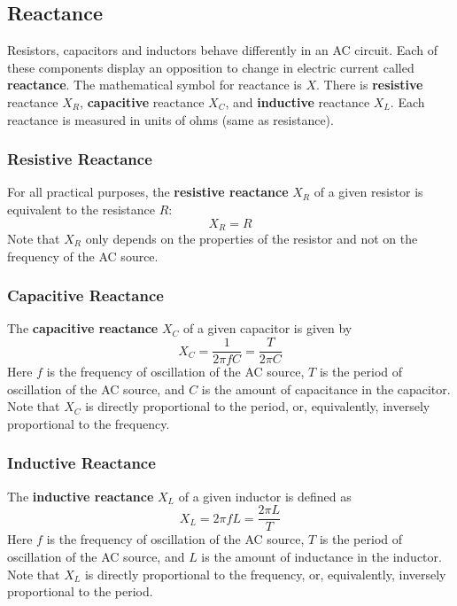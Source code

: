 \subsection{Reactance}
Resistors, capacitors and inductors behave differently in an AC circuit. Each of these components display an opposition to change in electric current called \textbf{reactance}. The mathematical symbol for reactance is $X$. There is \textbf{resistive} reactance $X_{R}$, \textbf{capacitive} reactance $X_{C}$, and \textbf{inductive} reactance $X_{L}$. Each reactance is measured in units of ohms (same as resistance).
\subsubsection{Resistive Reactance}
For all practical purposes, the \textbf{resistive reactance} $X_{R}$ of a given resistor is equivalent to the resistance $R$:
\begin{equation} \label{eq.06.reactance.R}
	X_{R} = R
\end{equation}
Note that $X_{R}$ only depends on the properties of the resistor and not on the frequency of the AC source.
\subsubsection{Capacitive Reactance}
The \textbf{capacitive reactance} $X_{C}$ of a given capacitor is given by
\begin{equation} \label{eq.06.reactance.C}
	X_{C} = \frac{1}{2 \pi f C} = \frac{T}{2 \pi C}
\end{equation}
Here $f$ is the frequency of oscillation of the AC source, $T$ is the period of oscillation of the AC source, and $C$ is the amount of capacitance in the capacitor. Note that $X_{C}$ is directly proportional to the period, or, equivalently, inversely proportional to the frequency.
\subsubsection{Inductive Reactance}
The \textbf{inductive reactance} $X_{L}$ of a given inductor is defined as
\begin{equation} \label{eq.06.reactance.L}
	X_{L} = 2 \pi f L = \frac{2 \pi L}{T}
\end{equation}
Here $f$ is the frequency of oscillation of the AC source, $T$ is the period of oscillation of the AC source, and $L$ is the amount of inductance in the inductor. Note that $X_{L}$ is directly proportional to the frequency, or, equivalently, inversely proportional to the period.
